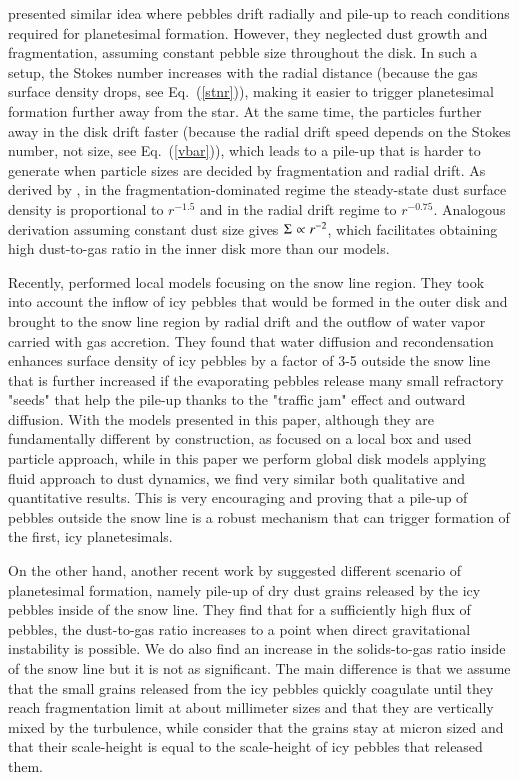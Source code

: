 \documentclass{aa}
\begin{document}
\citet{2016ApJ...828L...2A} presented similar idea where pebbles drift radially and pile-up to reach conditions required for planetesimal formation. However, they neglected dust growth and fragmentation, assuming constant pebble size throughout the disk. In such a setup, the Stokes number increases with the radial distance (because the gas surface density drops, see Eq.~(\ref{stnr})), making it easier to trigger planetesimal formation further away from the star. At the same time, the particles further away in the disk drift faster (because the radial drift speed depends on the Stokes number, not size, see Eq.~(\ref{vbar})), which leads to a pile-up that is harder to generate when particle sizes are decided by fragmentation and radial drift. As derived by \citet{2012A&A...539A.148B}, in the fragmentation-dominated regime the steady-state dust surface density is proportional to $r^{-1.5}$ and in the radial drift regime to $r^{-0.75}$. Analogous derivation assuming constant dust size gives $\Sigma_{\rm}\propto r^{-2}$, which facilitates obtaining high dust-to-gas ratio in the inner disk more than our models.

Recently, \citet{2017A&A...602A..21S} performed local models focusing on the snow line region. They took into account the inflow of icy pebbles that would be formed in the outer disk and brought to the snow line region by radial drift and the outflow of water vapor carried with gas accretion. They found that water diffusion and recondensation enhances surface density of icy pebbles by a factor of 3-5 outside the snow line that is further increased if the evaporating pebbles release many small refractory "seeds" that help the pile-up thanks to the "traffic jam" effect and outward diffusion. With the models presented in this paper, although they are fundamentally different by construction, as \citet{2017A&A...602A..21S} focused on a local box and used particle approach, while in this paper we perform global disk models applying fluid approach to dust dynamics, we find very similar both qualitative and quantitative results. This is very encouraging and proving that a pile-up of pebbles outside the snow line is a robust mechanism that can trigger formation of the first, icy planetesimals.

On the other hand, another recent work by \citet{2016A&A...596L...3I} suggested different scenario of planetesimal formation, namely pile-up of dry dust grains released by the icy pebbles inside of the snow line. They find that for a sufficiently high flux of pebbles, the dust-to-gas ratio increases to a point when direct gravitational instability is possible. We do also find an increase in the solids-to-gas ratio inside of the snow line but it is not as significant. The main difference is that we assume that the small grains released from the icy pebbles quickly coagulate until they reach fragmentation limit at about millimeter sizes and that they are vertically mixed by the turbulence, while \citet{2016A&A...596L...3I} consider that the grains stay at micron sized and that their scale-height is equal to the scale-height of icy pebbles that released them. 
\end{document}
